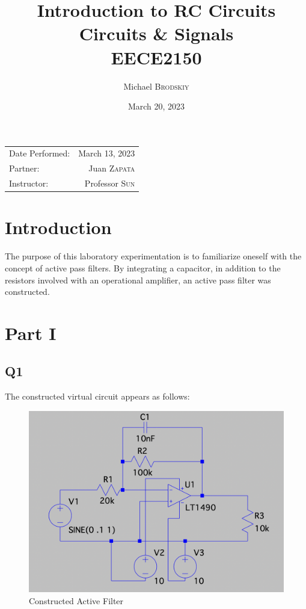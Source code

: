 \documentclass[
	letterpaper, %
	10pt, %
]{CSUniSchoolLabReport}
\title{Introduction to RC Circuits \\ Circuits \& Signals \\ EECE2150} %
\author{Michael \textsc{Brodskiy}}
\date{March 20, 2023} %
\begin{document}
\maketitle %

\begin{center}
	\begin{tabular}{l r}
		Date Performed: & March 13, 2023 \\ %
        Partner: & Juan \textsc{Zapata} \\ %
		Instructor: & Professor \textsc{Sun} %
	\end{tabular}
\end{center}

\setcounter{section}{-1}

\section{Introduction}

The purpose of this laboratory experimentation is to familiarize oneself with the concept of active pass filters. By integrating a capacitor, in addition to the resistors involved with an operational amplifier, an active pass filter was constructed.

  \section{Part I}

  \subsection{Q1} The constructed virtual circuit appears as follows:

  \begin{figure}[H]
    \centering
    \includegraphics[width=.9\textwidth]{Figures/L10Circ.png}
    \caption{Constructed Active Filter}
    \label{fig:1}
  \end{figure}
\end{document}
